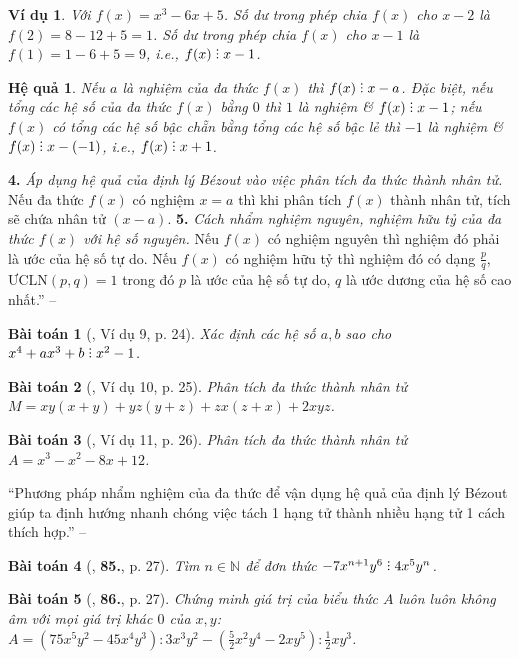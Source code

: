 \documentclass{article}
\numberwithin{equation}{section}
\newtheorem{baitoan}{Bài toán}
\newtheorem{hequa}{Hệ quả}[section]
\newtheorem{vidu}{Ví dụ}[section]
\DeclareRobustCommand{\divby}{%
	\mathrel{\vbox{\baselineskip.65ex\lineskiplimit0pt\hbox{.}\hbox{.}\hbox{.}}}%
}
\begin{document}
\begin{vidu}
	Với $f(x) = x^3 - 6x + 5$. Số dư trong phép chia $f(x)$ cho $x - 2$ là $f(2) = 8 - 12 + 5 = 1$. Số dư trong phép chia $f(x)$ cho $x - 1$ là $f(1) = 1 - 6 + 5 = 9$, i.e., $f(x)\divby x - 1$.
\end{vidu}

\begin{hequa}
	Nếu $a$ là nghiệm của đa thức $f(x)$ thì $f(x)\divby x - a$. Đặc biệt, nếu tổng các hệ số của đa thức $f(x)$ bằng $0$ thì $1$ là nghiệm \& $f(x)\divby x - 1$; nếu $f(x)$ có tổng các hệ số bậc chẵn bằng tổng các hệ số bậc lẻ thì $-1$ là nghiệm \& $f(x)\divby x -(-1)$, i.e., $f(x)\divby x + 1$.
\end{hequa}
\textbf{4.} \textit{Áp dụng hệ quả của định lý B\'ezout vào việc phân tích đa thức thành nhân tử.} Nếu đa thức $f(x)$ có nghiệm $x = a$ thì khi phân tích $f(x)$ thành nhân tử, tích sẽ chứa nhân tử $(x - a)$. \textbf{5.} \textit{Cách nhẩm nghiệm nguyên, nghiệm hữu tỷ của đa thức $f(x)$ với hệ số nguyên.} Nếu $f(x)$ có nghiệm nguyên thì nghiệm đó phải là ước của hệ số tự do. Nếu $f(x)$ có nghiệm hữu tỷ thì nghiệm đó có dạng $\frac{p}{q}$, $\mbox{ƯCLN}(p,q) = 1$ trong đó $p$ là ước của hệ số tự do, $q$ là ước dương của hệ số cao nhất.'' -- \cite[\S4, pp. 22--24]{Tuyen_Toan_8}

\begin{baitoan}[\cite{Tuyen_Toan_8}, Ví dụ 9, p. 24]
	Xác định các hệ số $a,b$ sao cho $x^4 + ax^3 + b\divby x^2 - 1$.
\end{baitoan}

\begin{baitoan}[\cite{Tuyen_Toan_8}, Ví dụ 10, p. 25]
	Phân tích đa thức thành nhân tử $M = xy(x + y) + yz(y + z) + zx(z + x) + 2xyz$.
\end{baitoan}

\begin{baitoan}[\cite{Tuyen_Toan_8}, Ví dụ 11, p. 26]
	Phân tích đa thức thành nhân tử $A = x^3 - x^2 - 8x + 12$.
\end{baitoan}
``Phương pháp nhẩm nghiệm của đa thức để vận dụng hệ quả của định lý B\'ezout giúp ta định hướng nhanh chóng việc tách 1 hạng tử thành nhiều hạng tử 1 cách thích hợp.'' -- \cite[p. 26]{Tuyen_Toan_8}

\begin{baitoan}[\cite{Tuyen_Toan_8}, \textbf{85.}, p. 27]
	Tìm $n\in\mathbb{N}$ để đơn thức $-7x^{n+1}y^6\divby4x^5y^n$.
\end{baitoan}

\begin{baitoan}[\cite{Tuyen_Toan_8}, \textbf{86.}, p. 27]
	Chứng minh giá trị của biểu thức $A$ luôn luôn không âm với mọi giá trị khác $0$ của $x,y$: $A = (75x^5y^2 - 45x^4y^3):3x^3y^2 - \left(\frac{5}{2}x^2y^4 - 2xy^5\right):\frac{1}{2}xy^3$.
\end{baitoan}
\end{document}
